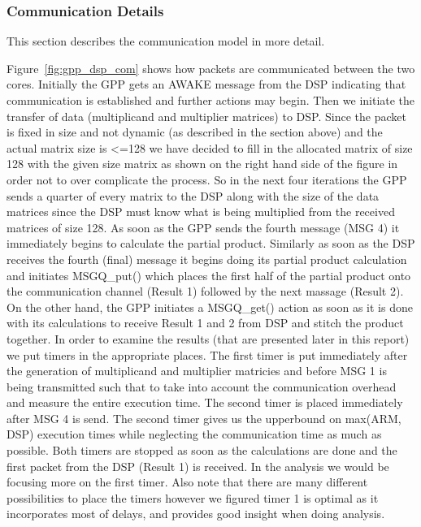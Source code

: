 \subsubsection{Communication Details}
This section describes the communication model in more detail.

Figure~\ref{fig:gpp_dsp_com} shows how packets are communicated between the two cores. Initially the GPP gets an AWAKE message from the DSP indicating that communication is established and further actions may begin.
Then we initiate the transfer of data (multiplicand and multiplier matrices) to DSP. Since the packet is fixed in size and not dynamic (as described in the section above) and the actual matrix size is <=128 we have decided to fill in the allocated matrix of size 128 with the given size matrix as shown on the right hand side of the figure in order not to over complicate the process.
So in the next four iterations the GPP sends a quarter of every matrix to the DSP along with the size of the data matrices since the DSP must know what is being multiplied from the received matrices of size 128. As soon as the GPP sends the fourth message (MSG 4) it immediately begins to calculate the partial product. Similarly as soon as the DSP receives the fourth (final) message it begins doing its partial product calculation and initiates MSGQ\_put() which places the first half of the partial product onto the communication channel (Result 1) followed by the next massage (Result 2). On the other hand, the GPP initiates a MSGQ\_get() action as soon as it is done with its calculations to receive Result 1 and 2 from DSP and stitch the product together.
In order to examine the results (that are presented later in this report) we put timers in the appropriate places. The first timer is put immediately after the generation of multiplicand and multiplier matricies and before MSG 1 is being transmitted such that to take into account the communication overhead and measure the entire execution time.
The second timer is placed immediately after MSG 4 is send. The second timer gives us the upperbound on max(ARM, DSP) execution times while neglecting the communication time as much as possible. Both timers are stopped as soon as the calculations are done and the first packet from the DSP (Result 1) is received. In the analysis we would be focusing more on the first timer.
Also note that there are many different possibilities to place the timers however we figured timer 1 is optimal as it incorporates most of delays, and provides good insight when doing analysis.

